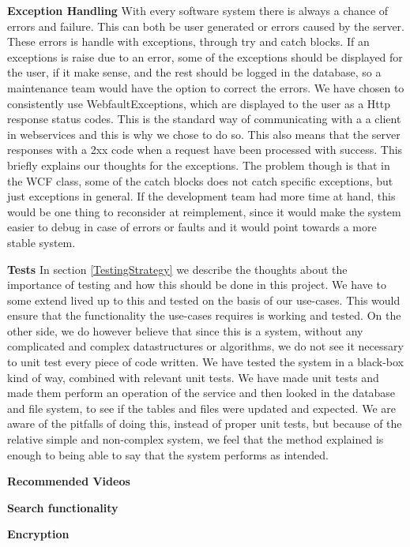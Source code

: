\textbf{Exception Handling}
With every software system there is always a chance of errors and failure. This can both be user generated or errors caused by the server. These errors is handle with exceptions, through try and catch blocks. If an exceptions is raise due to an error, some of the exceptions should be displayed for the user, if it make sense, and the rest should be logged in the database, so a maintenance team would have the option to correct the errors. We have chosen to consistently use WebfaultExceptions, which are displayed to the user as a Http response status codes. This is the standard way of communicating with a a client in webservices and this is why we chose to do so. This also means that the server responses with a 2xx code when a request have been processed with success. This briefly explains our thoughts for the exceptions. The problem though is that in the WCF class, some of the catch blocks does not catch specific exceptions, but just exceptions in general. If the development team had more time at hand, this would be one thing to reconsider at reimplement, since it would make the system easier to debug in case of errors or faults and it would point towards a more stable system.  
 
\textbf{Tests}
In section \ref{TestingStrategy} we describe the thoughts about the importance of testing and how this should be done in this project. We have to some extend lived up to this and tested on the basis of our use-cases. This would ensure that the functionality the use-cases requires is working and tested. On the other side, we do however believe that since this is a system, without any complicated and complex datastructures or algorithms, we do not see it necessary to unit test every piece of code written. We have tested the system in a black-box kind of way, combined with relevant unit tests. We have made unit tests and made them perform an operation of the service and then looked in the database and file system, to see if the tables and files were updated and expected. We are aware of the pitfalls of doing this, instead of proper unit tests, but because of the relative simple and non-complex system, we feel that the method explained is enough to being able to say that the system performs as intended.

\textbf{Recommended Videos}

\textbf{Search functionality}

\textbf{Encryption}
 




 